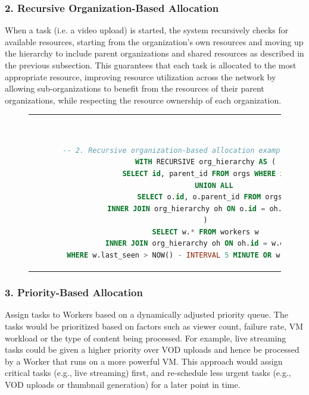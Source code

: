 \subsubsection{2. Recursive Organization-Based Allocation}
    When a task (i.e. a video upload) is started, the system recursively checks for available resources, starting from the organization's own resources and moving up the hierarchy to include parent organizations and shared resources as described in the previous subsection. This guarantees that each task is allocated to the most appropriate resource, improving resource utilization across the network by allowing sub-organizations to benefit from the resources of their parent organizations, while respecting the resource ownership of each organization.

    \begin{figure}[htpb]
      \begin{tabular}{c}
      \ \small \begin{lstlisting}[language=SQL]
        -- 2. Recursive organization-based allocation example query
        WITH RECURSIVE org_hierarchy AS (
            SELECT id, parent_id FROM orgs WHERE id = ?
            UNION ALL
            SELECT o.id, o.parent_id FROM orgs o
            INNER JOIN org_hierarchy oh ON o.id = oh.parent_id
        )
        SELECT w.* FROM workers w
        INNER JOIN org_hierarchy oh ON oh.id = w.org_id
        WHERE w.last_seen > NOW() - INTERVAL 5 MINUTE OR w.shared = true;
        \end{lstlisting}
      \end{tabular}
      \label{fig:recursive-allocation}
    \end{figure}

\subsubsection{3. Priority-Based Allocation}
    Assign tasks to Workers based on a dynamically adjusted priority queue. The tasks would be prioritized based on factors such as viewer count, failure rate, \ac{VM} workload or the type of content being processed. For example, live streaming tasks could be given a higher priority over \ac{VOD} uploads and hence be processed by a Worker that runs on a more powerful \ac{VM}. This approach would assign critical tasks (e.g., live streaming) first, and re-schedule less urgent tasks (e.g., \ac{VOD} uploads or thumbnail generation) for a later point in time.

